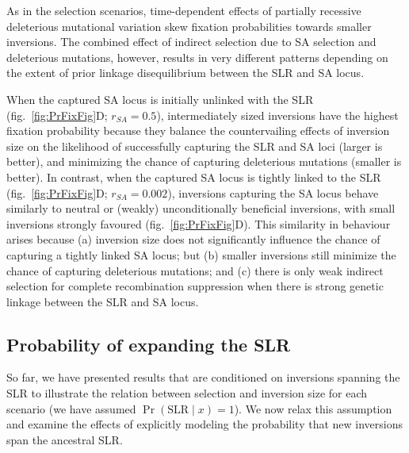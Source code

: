 \documentclass{article}[12pt]
\begin{document}
As in the selection scenarios, time-dependent effects of partially recessive deleterious mutational variation skew fixation probabilities towards smaller inversions. The combined effect of indirect selection due to SA selection and deleterious mutations, however, results in very different patterns depending on the extent of prior linkage disequilibrium between the SLR and SA locus. 

When the captured SA locus is initially unlinked with the SLR (fig.~\ref{fig:PrFixFig}D; $r_{SA} = 0.5$), intermediately sized inversions have the highest fixation probability because they balance the countervailing effects of inversion size on the likelihood of successfully capturing the SLR and SA loci (larger is better), and minimizing the chance of capturing deleterious mutations (smaller is better). In contrast, when the captured SA locus is tightly linked to the SLR (fig.~\ref{fig:PrFixFig}D; $r_{SA} = 0.002$), inversions capturing the SA locus behave similarly to neutral or (weakly) unconditionally beneficial inversions, with small inversions strongly favoured (fig.~\ref{fig:PrFixFig}D). This similarity in behaviour arises because (a) inversion size does not significantly influence the chance of capturing a tightly linked SA locus; but (b) smaller inversions still minimize the chance of capturing deleterious mutations; and (c) there is only weak indirect selection for complete recombination suppression when there is strong genetic linkage between the SLR and SA locus.



\subsection*{Probability of expanding the SLR}\label{sec:ProbExpSLR}

So far, we have presented results that are conditioned on inversions spanning the SLR to illustrate the relation between selection and inversion size for each scenario (we have assumed $\Pr(\text{SLR} \mid x) = 1$). %
We now relax this assumption and examine the effects of explicitly modeling the probability that new inversions span the ancestral SLR.
\end{document}
